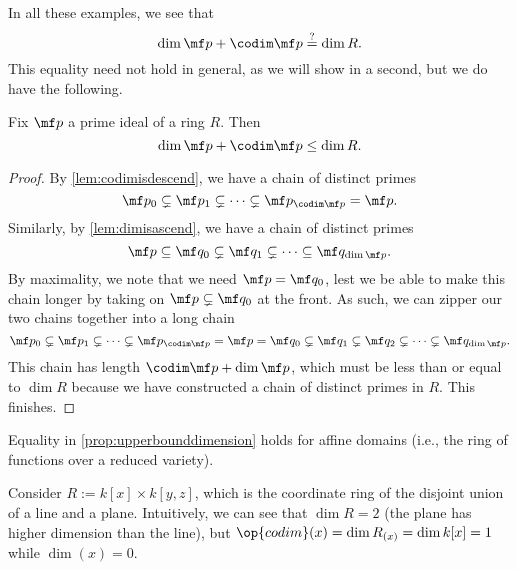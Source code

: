In all these examples, we see that
\[\dim\mf p+\codim\mf p\stackrel?=\dim R.\]
This equality need not hold in general, as we will show in a second, but we do have the following.
\begin{proposition} \label{prop:upperbounddimension}
	Fix $\mf p$ a prime ideal of a ring $R$. Then
	\[\dim\mf p+\codim\mf p\le\dim R.\]
\end{proposition}
\begin{proof}
	By \autoref{lem:codimisdescend}, we have a chain of distinct primes
	\[\mf p_0\subsetneq\mf p_1\subsetneq\cdots\subsetneq\mf p_{\codim\mf p}=\mf p.\]
	Similarly, by \autoref{lem:dimisascend}, we have a chain of distinct primes
	\[\mf p\subseteq\mf q_0\subsetneq\mf q_1\subsetneq\cdots\subseteq\mf q_{\dim\mf p}.\]
	By maximality, we note that we need $\mf p=\mf q_0$, lest we be able to make this chain longer by taking on $\mf p\subsetneq\mf q_0$ at the front. As such, we can zipper our two chains together into a long chain
	\[\mf p_0\subsetneq\mf p_1\subsetneq\cdots\subsetneq\mf p_{\codim\mf p}=\mf p=\mf q_0\subsetneq\mf q_1\subsetneq\mf q_2\subsetneq\cdots\subsetneq\mf q_{\dim\mf p}.\]
	This chain has length $\codim\mf p+\dim\mf p$, which must be less than or equal to $\dim R$ because we have constructed a chain of distinct primes in $R$. This finishes.
\end{proof}
\begin{remark}
	Equality in \autoref{prop:upperbounddimension} holds for affine domains (i.e., the ring of functions over a reduced variety).
\end{remark}
\begin{example}
	Consider $R:=k[x]\times k[y,z]$, which is the coordinate ring of the disjoint union of a line and a plane. Intuitively, we can see that $\dim R=2$ (the plane has higher dimension than the line), but $\op{codim}(x)=\dim R_{(x)}=\dim k[x]=1$ while $\dim(x)=0$. %
\end{example}

